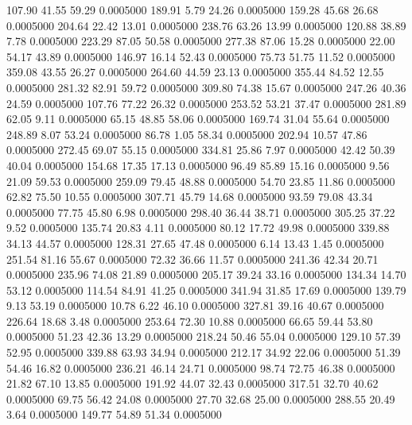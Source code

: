  107.90   41.55   59.29   0.0005000
 189.91    5.79   24.26   0.0005000
 159.28   45.68   26.68   0.0005000
 204.64   22.42   13.01   0.0005000
 238.76   63.26   13.99   0.0005000
 120.88   38.89    7.78   0.0005000
 223.29   87.05   50.58   0.0005000
 277.38   87.06   15.28   0.0005000
  22.00   54.17   43.89   0.0005000
 146.97   16.14   52.43   0.0005000
  75.73   51.75   11.52   0.0005000
 359.08   43.55   26.27   0.0005000
 264.60   44.59   23.13   0.0005000
 355.44   84.52   12.55   0.0005000
 281.32   82.91   59.72   0.0005000
 309.80   74.38   15.67   0.0005000
 247.26   40.36   24.59   0.0005000
 107.76   77.22   26.32   0.0005000
 253.52   53.21   37.47   0.0005000
 281.89   62.05    9.11   0.0005000
  65.15   48.85   58.06   0.0005000
 169.74   31.04   55.64   0.0005000
 248.89    8.07   53.24   0.0005000
  86.78    1.05   58.34   0.0005000
 202.94   10.57   47.86   0.0005000
 272.45   69.07   55.15   0.0005000
 334.81   25.86    7.97   0.0005000
  42.42   50.39   40.04   0.0005000
 154.68   17.35   17.13   0.0005000
  96.49   85.89   15.16   0.0005000
   9.56   21.09   59.53   0.0005000
 259.09   79.45   48.88   0.0005000
  54.70   23.85   11.86   0.0005000
  62.82   75.50   10.55   0.0005000
 307.71   45.79   14.68   0.0005000
  93.59   79.08   43.34   0.0005000
  77.75   45.80    6.98   0.0005000
 298.40   36.44   38.71   0.0005000
 305.25   37.22    9.52   0.0005000
 135.74   20.83    4.11   0.0005000
  80.12   17.72   49.98   0.0005000
 339.88   34.13   44.57   0.0005000
 128.31   27.65   47.48   0.0005000
   6.14   13.43    1.45   0.0005000
 251.54   81.16   55.67   0.0005000
  72.32   36.66   11.57   0.0005000
 241.36   42.34   20.71   0.0005000
 235.96   74.08   21.89   0.0005000
 205.17   39.24   33.16   0.0005000
 134.34   14.70   53.12   0.0005000
 114.54   84.91   41.25   0.0005000
 341.94   31.85   17.69   0.0005000
 139.79    9.13   53.19   0.0005000
  10.78    6.22   46.10   0.0005000
 327.81   39.16   40.67   0.0005000
 226.64   18.68    3.48   0.0005000
 253.64   72.30   10.88   0.0005000
  66.65   59.44   53.80   0.0005000
  51.23   42.36   13.29   0.0005000
 218.24   50.46   55.04   0.0005000
 129.10   57.39   52.95   0.0005000
 339.88   63.93   34.94   0.0005000
 212.17   34.92   22.06   0.0005000
  51.39   54.46   16.82   0.0005000
 236.21   46.14   24.71   0.0005000
  98.74   72.75   46.38   0.0005000
  21.82   67.10   13.85   0.0005000
 191.92   44.07   32.43   0.0005000
 317.51   32.70   40.62   0.0005000
  69.75   56.42   24.08   0.0005000
  27.70   32.68   25.00   0.0005000
 288.55   20.49    3.64   0.0005000
 149.77   54.89   51.34   0.0005000
